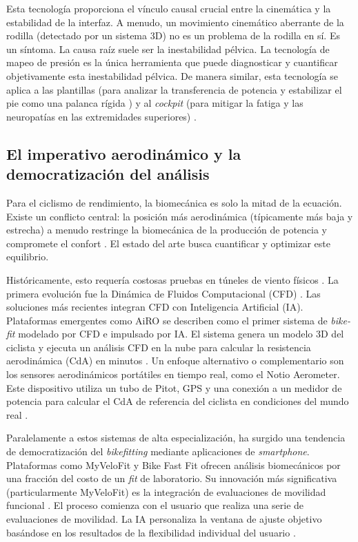 Esta tecnología proporciona el vínculo causal crucial entre la cinemática y la
estabilidad de la interfaz. A menudo, un movimiento cinemático aberrante de la
rodilla (detectado por un sistema 3D) no es un problema de la rodilla en sí. Es
un síntoma. La causa raíz suele ser la inestabilidad pélvica. La tecnología de
mapeo de presión es la única herramienta que puede diagnosticar y cuantificar
objetivamente esta inestabilidad pélvica. De manera similar, esta tecnología se
aplica a las plantillas (para analizar la transferencia de potencia y
estabilizar el pie como una palanca rígida \citep{pruitt:trainingpeaks}) y al
\textit{cockpit} (para mitigar la fatiga y las neuropatías en las extremidades
superiores) \citep{gebiomized:web}.

\subsection{El imperativo aerodinámico y la democratización del análisis}

Para el ciclismo de rendimiento, la biomecánica es solo la mitad de la
ecuación. Existe un conflicto central: la posición más aerodinámica
(típicamente más baja y estrecha) a menudo restringe la biomecánica de la
producción de potencia y compromete el confort \citep{pruitt:trainingpeaks}. El
estado del arte busca cuantificar y optimizar este equilibrio.

Históricamente, esto requería costosas pruebas en túneles de viento físicos
\citep{poc:cfd}. La primera evolución fue la Dinámica de Fluidos Computacional
(CFD) \citep{cfd:recumbent, vanDrunen:aero}. Las soluciones más recientes integran CFD con
Inteligencia Artificial (IA). Plataformas emergentes como AiRO \citep{airo:launch} se describen
como el primer sistema de \textit{bike-fit} modelado por CFD e impulsado por
IA. El sistema genera un modelo 3D del ciclista y ejecuta un análisis CFD en la
nube para calcular la resistencia aerodinámica (CdA) en minutos
\citep{airo:launch}. Un enfoque alternativo o complementario son los sensores
aerodinámicos portátiles en tiempo real, como el Notio Aerometer. Este
dispositivo utiliza un tubo de Pitot, GPS y una conexión a un medidor de
potencia para calcular el CdA de referencia del ciclista en condiciones del
mundo real \citep{notio:web, gtn:notio_experiment}.

Paralelamente a estos sistemas de alta especialización, ha surgido una
tendencia de democratización del \textit{bikefitting} mediante aplicaciones de
\textit{smartphone}. Plataformas como MyVeloFit \citep{myvelofit:online} y Bike
Fast Fit \citep{bikefastfit:web} ofrecen análisis biomecánicos por una fracción
del costo de un \textit{fit} de laboratorio. Su innovación más significativa
(particularmente MyVeloFit) es la integración de evaluaciones de movilidad
funcional \citep{delphi:consensus}. El proceso comienza con el usuario que realiza una serie de
evaluaciones de movilidad. La IA personaliza la ventana de ajuste objetivo
basándose en los resultados de la flexibilidad individual del usuario
\citep{myvelofit:online}.


